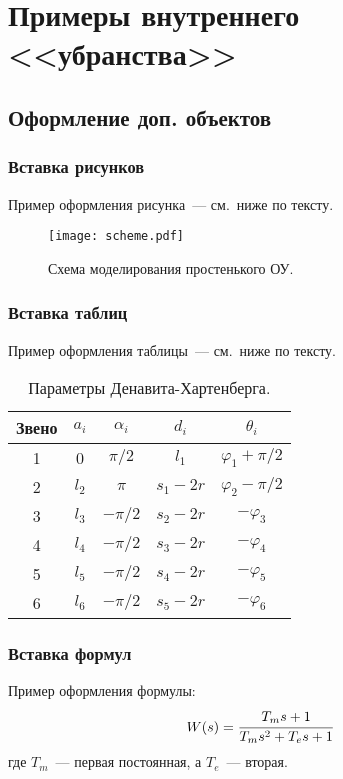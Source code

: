 \section{Примеры внутреннего <<убранства>>}\label{part_example_of_doc_inside}
\subsection{Оформление доп. объектов}\label{part_pasting_of_extra_objects}
\subsubsection{Вставка рисунков}\label{part_pasting_of_figures}
Пример оформления рисунка~--- см.~ниже по тексту.

\begin{figure}[h]
    \centering
    \texttt{[image: scheme.pdf]}
    \caption{Схема моделирования простенького ОУ.}
    \label{figure_just_example}
\end{figure}


\subsubsection{Вставка таблиц}\label{part_pasting_of_tables}
Пример оформления таблицы~--- см.~ниже по тексту.

\begin{table}[h]
    \caption{Параметры Денавита-Хартенберга.}
    \begin{tabular}{|c|c|c|c|c|}
        \hline
        Звено & $a_i$ & $\alpha_i$ & $d_i$ & $\theta_i$\\
        \hline
        1 & 0 & $\pi/2$ & $l_1$ & $\varphi_1+\pi/2$\\
        \hline
        2  & $l_2$ & $\pi$ & $s_1-2r$ & $\varphi_2-\pi/2$\\
        \hline
        3 & $l_3$ & $-\pi/2$ & $s_2-2r$ & $-\varphi_3$\\
        \hline
        4 & $l_4$ & $-\pi/2$ & $s_3-2r$ & $-\varphi_4$\\
        \hline
        5 & $l_5$ & $-\pi/2$ & $s_4-2r$ & $-\varphi_5$\\
        \hline
        6 & $l_6$ & $-\pi/2$ & $s_5-2r$ & $-\varphi_6$\\
        \hline
    \end{tabular}
    \label{table_DH_params}
\end{table}


\subsubsection{Вставка формул}\label{part_pasting_of_formulas}
Пример оформления формулы:
\begin{equation}\label{eq_example_of_formula}
    W(s) = \cfrac{T_ms+1}{T_ms^2+T_es+1}
\end{equation}
где $T_m$~--- первая постоянная, а $T_e$~--- вторая.


